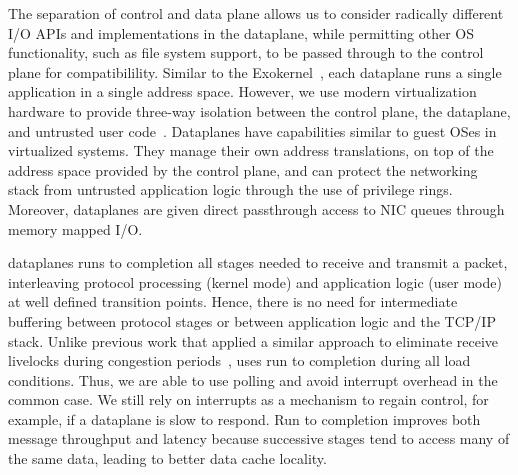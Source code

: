The separation of control and data plane allows us to consider
radically different I/O APIs and implementations in the dataplane,
while permitting other OS functionality, such as file system support,
to be passed through to the control plane for compatibilility.
Similar to the Exokernel~\cite{DBLP:conf/sosp/EnglerKO95}, each
dataplane runs a single application in a single address
space. However, we use modern virtualization hardware to provide
three-way isolation between the control plane, the dataplane, and
untrusted user code~\cite{dune}. Dataplanes have capabilities similar
to guest OSes in virtualized systems. They manage their own address
translations, on top of the address space provided by the control
plane, and can protect the networking stack from untrusted application
logic through the use of privilege rings. Moreover, dataplanes are
given direct passthrough access to NIC queues through memory mapped
I/O.



 \ix dataplanes
runs to completion all stages needed to receive and transmit a packet,
interleaving protocol processing (kernel mode) and application logic
(user mode) at well defined transition points. Hence, there is no need
for intermediate buffering between protocol stages or between
application logic and the TCP/IP stack.  Unlike previous work that
applied a similar approach to eliminate receive livelocks during
congestion periods~\cite{receive-livelock}, \ix uses run to completion
during all load conditions. Thus, we are able to use polling and avoid
interrupt overhead in the common case. We still rely on interrupts as
a mechanism to regain control, for example, if a dataplane is slow to
respond.  Run to completion improves both message throughput and
latency because successive stages tend to access many of the same
data, leading to better data cache locality.


